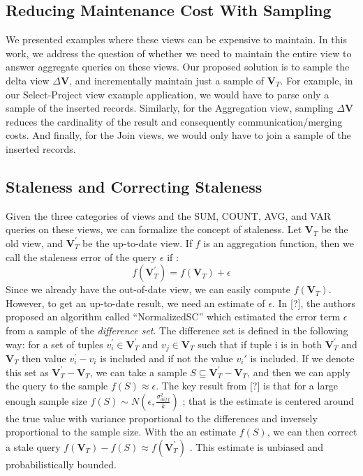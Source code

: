 \subsection{Reducing Maintenance Cost With Sampling}

We presented examples where these views can be expensive to maintain.
In this work, we address the question of whether we need to maintain
the entire view to answer aggregate queries on these views. Our proposed
solution is to sample the delta view $\Delta\textbf{V}$, and incrementally
maintain just a sample of $\textbf{V}_{T}$. For example, in our Select-Project
view example application, we would have to parse only a sample of
the inserted records. Similarly, for the Aggregation view, sampling
$\Delta\textbf{V}$ reduces the cardinality of the result and consequently
communication/merging costs. And finally, for the Join views, we would
only have to join a sample of the inserted records.


\subsection{Staleness and Correcting Staleness}

Given the three categories of views and the SUM, COUNT, AVG, and VAR
queries on these views, we can formalize the concept of staleness.
Let $\textbf{V}_{T}$ be the old view, and $\textbf{V}_{T}^{'}$ be
the up-to-date view. If $f$ is an aggregation function, then we call
the staleness error of the query $\epsilon$ if :
\[
f(\textbf{V}_{T}^{'})=f(\textbf{V}_{T})+\epsilon
\]
Since we already have the out-of-date view, we can easily compute
$f(\textbf{V}_{T})$. However, to get an up-to-date result, we need
an estimate of $\epsilon$. In {[}?{]}, the authors proposed an algorithm
called ``NormalizedSC'' which estimated the error term $\epsilon$
from a sample of the \emph{difference set}. The difference set is
defined in the following way: for a set of tuples $v_{i}^{'}\in\textbf{V}_{T}^{'}$
and $v_{j}\in\textbf{V}_{T}$ such that if tuple i is in both $\textbf{V}_{T}^{'}$
and $\textbf{V}_{T}$ then value $v_{i}^{'}-v_{i}$ is included and
if not the value $v_{i}'$ is included. If we denote this set as $\textbf{V}_{T}^{'}-\textbf{V}_{T}$$ $,
we can take a sample $S\subseteq\textbf{V}_{T}^{'}-\textbf{V}_{T}$,
and then we can apply the query to the sample $f(S)\approx\epsilon$.
The key result from {[}?{]} is that for a large enough sample size
$f(S)\sim N(\epsilon,\frac{\sigma_{diff}^{2}}{k})$ ; that is the
estimate is centered around the true value with variance proportional
to the differences and inversely proportional to the sample size.
With the an estimate $f(S)$, we can then correct a stale query $f(\textbf{V}_{T})-f(S)\approx f(\textbf{V}_{T}^{'})$
. This estimate is unbiased and probabilistically bounded.

